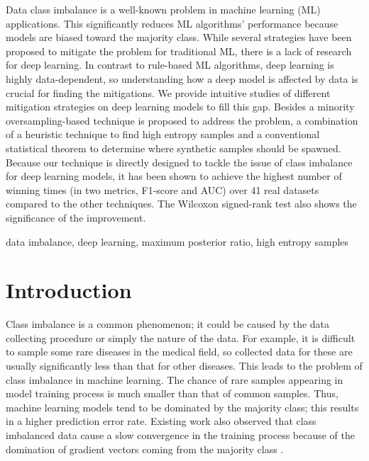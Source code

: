\documentclass[journal]{IEEEtai}
\begin{document}
\begin{IEEEImpStatement}
	Data class imbalance is a well-known problem in machine learning (ML) applications. This significantly reduces ML algorithms' performance because models are biased toward the majority class. While several strategies have been proposed to mitigate the problem for traditional ML, there is a lack of research for deep learning. In contrast to rule-based ML algorithms, deep learning is highly data-dependent, so understanding how a deep model is affected by data is crucial for finding the mitigations. We provide intuitive studies of different mitigation strategies on deep learning models to fill this gap. Besides a minority oversampling-based technique is proposed to address the problem, a combination of a heuristic technique to find high entropy samples and a conventional statistical theorem to determine where synthetic samples should be spawned. Because our technique is directly designed to tackle the issue of class imbalance for deep learning models, it has been shown to achieve the highest number of winning times (in two metrics, F1-score and AUC) over 41 real datasets compared to the other techniques. The Wilcoxon signed-rank test also shows the significance of the improvement.   
\end{IEEEImpStatement}


\begin{IEEEkeywords}
	data imbalance, deep learning, maximum posterior ratio, high entropy samples  
\end{IEEEkeywords}


\section{Introduction}
Class imbalance is a common phenomenon; it could be caused by the data collecting procedure or simply the nature of the data. For example, it is difficult to sample some rare diseases in the medical field, so collected data for these are usually significantly less than that for other diseases. This leads to the problem of class imbalance in machine learning. The chance of rare samples appearing in model training process is much smaller than that of common samples. Thus, machine learning models tend to be dominated by the majority class; this results in a higher prediction error rate. Existing work also observed that class imbalanced data cause a slow convergence in the training process because of the domination of gradient vectors coming from the majority class \cite{ya-guan_emsgd:_2020, liu_high-performance_2020}. 
\end{document}
